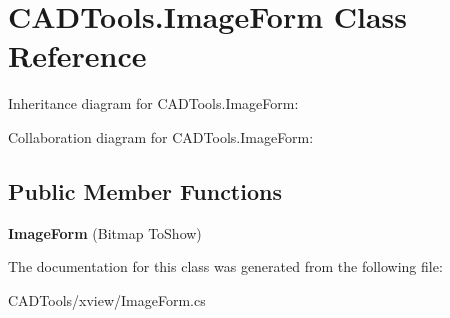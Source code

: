\hypertarget{class_c_a_d_tools_1_1_image_form}{}\section{C\+A\+D\+Tools.\+Image\+Form Class Reference}
\label{class_c_a_d_tools_1_1_image_form}


Inheritance diagram for C\+A\+D\+Tools.\+Image\+Form\+:


Collaboration diagram for C\+A\+D\+Tools.\+Image\+Form\+:
\subsection*{Public Member Functions}
\begin{DoxyCompactItemize}
\item 
\mbox{\label{class_c_a_d_tools_1_1_image_form_ad143315c224e17b243f431c2696fc9c1}} 
{\bfseries Image\+Form} (Bitmap To\+Show)
\end{DoxyCompactItemize}


The documentation for this class was generated from the following file\+:\begin{DoxyCompactItemize}
\item 
C\+A\+D\+Tools/xview/Image\+Form.\+cs\end{DoxyCompactItemize}
